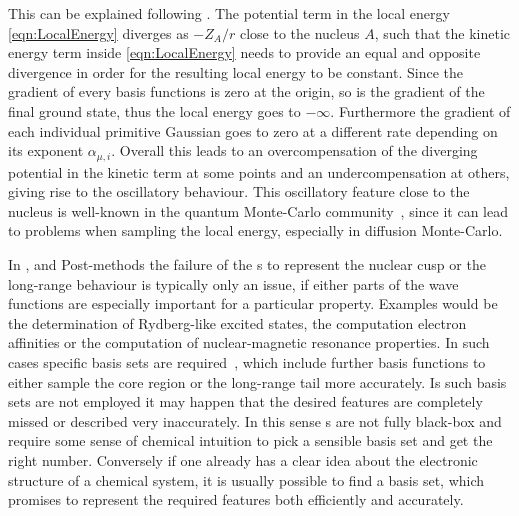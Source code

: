 This can be explained following \cite{Ma2005}.
The potential term in the local energy \eqref{eqn:LocalEnergy} diverges
as $-Z_A/r$ close to the nucleus $A$,
such that the kinetic energy term inside \eqref{eqn:LocalEnergy}
needs to provide an equal and opposite
divergence in order for the resulting local energy to be constant.
Since the gradient of every {\cGTO} basis functions is zero at the origin,
so is the gradient of the final \HF ground state,
thus the local energy goes to $-\infty$.
Furthermore the gradient of each individual primitive Gaussian
goes to zero at a different rate
depending on its exponent $\alpha_{\mu,i}$.
Overall this leads to an overcompensation
of the diverging potential in the kinetic term at some points
and an undercompensation at others,
giving rise to the oscillatory behaviour.
This oscillatory feature close to the nucleus is well-known
in the quantum Monte-Carlo community~\cite{Foulkes2001,Ma2005},
since it can lead to problems when sampling the local energy,
especially in diffusion Monte-Carlo.

In \HF, \DFT and Post-\HF methods
the failure of the {\cGTO}s to represent the nuclear cusp
or the long-range behaviour is typically only an issue,
if either parts of the wave functions are especially important
for a particular property.
Examples would be the determination of Rydberg-like excited states,
the computation electron affinities
or the computation of nuclear-magnetic resonance properties.
In such cases specific basis sets
are required~\cite{Hill2013,Jensen2013},
which include further \cGTO basis functions
to either sample the core region or the long-range tail
more accurately.
Is such basis sets are not employed
it may happen that the desired features are completely missed
or described very inaccurately.
In this sense {\cGTO}s are not fully black-box and
require some sense of chemical intuition to pick a sensible basis set
and get the right number.
Conversely if one already has a clear idea about the electronic structure
of a chemical system,
it is usually possible to find a basis set,
which promises to represent the required features both efficiently and accurately.

